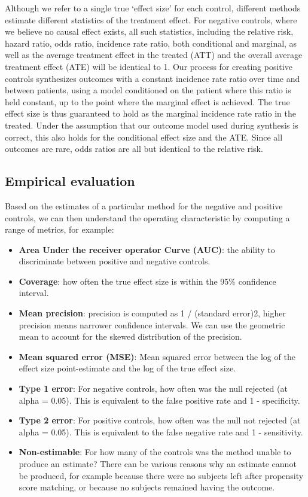 \documentclass[]{book}
\providecommand{\tightlist}{%
  \setlength{\itemsep}{0pt}\setlength{\parskip}{0pt}}
\begin{document}
Although we refer to a single true `effect size' for each control,
different methods estimate different statistics of the treatment effect.
For negative controls, where we believe no causal effect exists, all
such statistics, including the relative risk, hazard ratio, odds ratio,
incidence rate ratio, both conditional and marginal, as well as the
average treatment effect in the treated (ATT) and the overall average
treatment effect (ATE) will be identical to 1. Our process for creating
positive controls synthesizes outcomes with a constant incidence rate
ratio over time and between patients, using a model conditioned on the
patient where this ratio is held constant, up to the point where the
marginal effect is achieved. The true effect size is thus guaranteed to
hold as the marginal incidence rate ratio in the treated. Under the
assumption that our outcome model used during synthesis is correct, this
also holds for the conditional effect size and the ATE. Since all
outcomes are rare, odds ratios are all but identical to the relative
risk.

\subsection{Empirical evaluation}\label{empirical-evaluation}

Based on the estimates of a particular method for the negative and
positive controls, we can then understand the operating characteristic
by computing a range of metrics, for example:

\begin{itemize}
\tightlist
\item
  \textbf{Area Under the receiver operator Curve (AUC)}: the ability to
  discriminate between positive and negative controls.
\item
  \textbf{Coverage}: how often the true effect size is within the 95\%
  confidence interval.
\item
  \textbf{Mean precision}: precision is computed as 1 / (standard
  error)2, higher precision means narrower confidence intervals. We can
  use the geometric mean to account for the skewed distribution of the
  precision.
\item
  \textbf{Mean squared error (MSE)}: Mean squared error between the log
  of the effect size point-estimate and the log of the true effect size.
\item
  \textbf{Type 1 error}: For negative controls, how often was the null
  rejected (at alpha = 0.05). This is equivalent to the false positive
  rate and 1 - specificity.
\item
  \textbf{Type 2 error}: For positive controls, how often was the null
  not rejected (at alpha = 0.05). This is equivalent to the false
  negative rate and 1 - sensitivity.
\item
  \textbf{Non-estimable}: For how many of the controls was the method
  unable to produce an estimate? There can be various reasons why an
  estimate cannot be produced, for example because there were no
  subjects left after propensity score matching, or because no subjects
  remained having the outcome.
\end{itemize}
\end{document}
